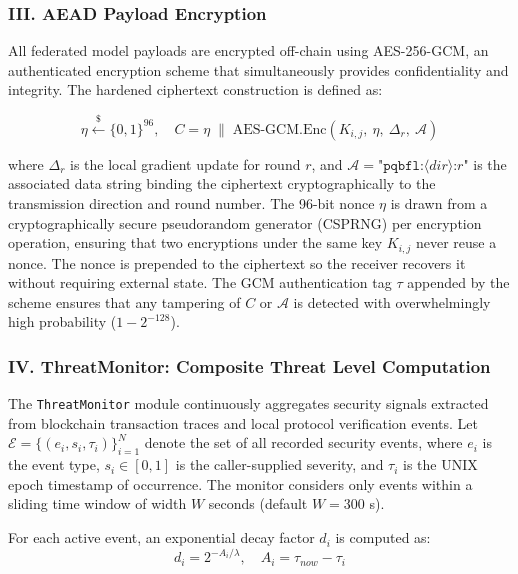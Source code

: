 \documentclass[journal, 10pt, twocolumn]{IEEEtran}
\begin{document}
\subsubsection{III. AEAD Payload Encryption}

All federated model payloads are encrypted off-chain using AES-256-GCM, an authenticated encryption scheme that simultaneously provides confidentiality and integrity. The hardened ciphertext construction is defined as:

\begin{equation}
\eta \xleftarrow{\$} \{0,1\}^{96}, \quad
C = \eta \;\|\; \text{AES-GCM.Enc}(K_{i,j},\ \eta,\ \Delta_r,\ \mathcal{A})
\label{eq:aead_enc}
\end{equation}

where $\Delta_r$ is the local gradient update for round $r$, and $\mathcal{A} = \texttt{"pqbfl:}\langle\textit{dir}\rangle\texttt{:}r\texttt{"}$ is the associated data string binding the ciphertext cryptographically to the transmission direction and round number. The 96-bit nonce $\eta$ is drawn from a cryptographically secure pseudorandom generator (CSPRNG) per encryption operation, ensuring that two encryptions under the same key $K_{i,j}$ never reuse a nonce. The nonce is prepended to the ciphertext so the receiver recovers it without requiring external state. The GCM authentication tag $\tau$ appended by the scheme ensures that any tampering of $C$ or $\mathcal{A}$ is detected with overwhelmingly high probability ($1 - 2^{-128}$).

\subsubsection{IV. ThreatMonitor: Composite Threat Level Computation}

The \texttt{ThreatMonitor} module continuously aggregates security signals extracted from blockchain transaction traces and local protocol verification events. Let $\mathcal{E} = \{(e_i, s_i, \tau_i)\}_{i=1}^{N}$ denote the set of all recorded security events, where $e_i$ is the event type, $s_i \in [0, 1]$ is the caller-supplied severity, and $\tau_i$ is the UNIX epoch timestamp of occurrence. The monitor considers only events within a sliding time window of width $W$ seconds (default $W = 300$ s).

For each active event, an exponential decay factor $d_i$ is computed as:
\begin{equation}
d_i = 2^{-A_i / \lambda}, \quad A_i = \tau_{now} - \tau_i
\label{eq:decay}
\end{equation}
\end{document}

